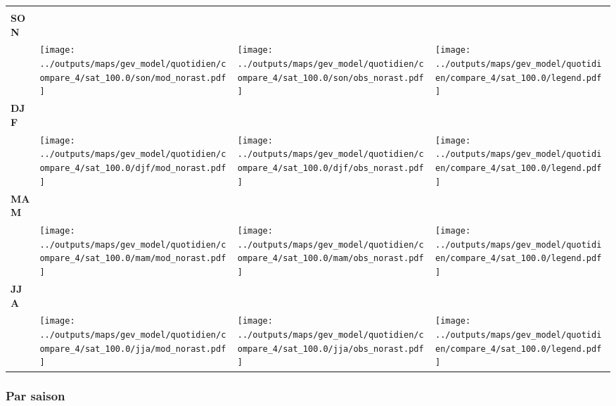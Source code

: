 \documentclass[
  letterpaper,
  DIV=11,
  numbers=noendperiod]{scrartcl}
\begin{document}
\begin{longtable*}{m{2.0cm}m{7.9cm}m{7.9cm}m{1cm}}
 & \centering  & \centering  & \tabularnewline
\centering \textbf{SON} \\[0.2em] \begin{tabular}{r@{\hspace{0.2em}}l}\end{tabular} & \centering \texttt{[image: ../outputs/maps/gev\_model/quotidien/compare\_4/sat\_100.0/son/mod\_norast.pdf]} & \centering \texttt{[image: ../outputs/maps/gev\_model/quotidien/compare\_4/sat\_100.0/son/obs\_norast.pdf]} & \centering \texttt{[image: ../outputs/maps/gev\_model/quotidien/compare\_4/sat\_100.0/legend.pdf]} \tabularnewline
\centering \textbf{DJF} \\[0.2em] \begin{tabular}{r@{\hspace{0.2em}}l}\end{tabular} & \centering \texttt{[image: ../outputs/maps/gev\_model/quotidien/compare\_4/sat\_100.0/djf/mod\_norast.pdf]} & \centering \texttt{[image: ../outputs/maps/gev\_model/quotidien/compare\_4/sat\_100.0/djf/obs\_norast.pdf]} & \centering \texttt{[image: ../outputs/maps/gev\_model/quotidien/compare\_4/sat\_100.0/legend.pdf]} \tabularnewline
\centering \textbf{MAM} \\[0.2em] \begin{tabular}{r@{\hspace{0.2em}}l}\end{tabular} & \centering \texttt{[image: ../outputs/maps/gev\_model/quotidien/compare\_4/sat\_100.0/mam/mod\_norast.pdf]} & \centering \texttt{[image: ../outputs/maps/gev\_model/quotidien/compare\_4/sat\_100.0/mam/obs\_norast.pdf]} & \centering \texttt{[image: ../outputs/maps/gev\_model/quotidien/compare\_4/sat\_100.0/legend.pdf]} \tabularnewline
\centering \textbf{JJA} \\[0.2em] \begin{tabular}{r@{\hspace{0.2em}}l}\end{tabular} & \centering \texttt{[image: ../outputs/maps/gev\_model/quotidien/compare\_4/sat\_100.0/jja/mod\_norast.pdf]} & \centering \texttt{[image: ../outputs/maps/gev\_model/quotidien/compare\_4/sat\_100.0/jja/obs\_norast.pdf]} & \centering \texttt{[image: ../outputs/maps/gev\_model/quotidien/compare\_4/sat\_100.0/legend.pdf]} \tabularnewline
\end{longtable*}

\subsubsection{Par saison}\label{par-saison-8}
\end{document}
